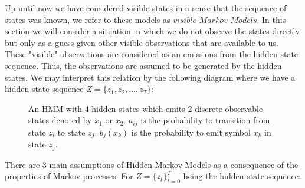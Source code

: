 Up until now we have considered visible states in a sense that the sequence of states was known, we refer to these models as $visible$ $Markov$ $Models$. In this section we will consider a situation in which we do not observe the states directly but only as a guess given other visible observations that are available to us. These "visible" observations are considered as an emissions from the hidden state sequence. Thus, the observations are assumed to be generated by the hidden states. We may interpret this relation by the following diagram where we have a hidden state sequence $Z = \{z_1,z_2,\ldots,z_T\}$:

\begin{figure}[htbp]
\begin{center}
\end{center}
\caption{An HMM with 4 hidden states which emits 2 discrete observable states denoted by $x_1$ or $x_2$.
$a_{ij}$ is the probability to transition from state $z_i$ to state $z_j$.
$b_j(x_k)$ is the probability to emit symbol $x_k$ in state $z_j$.}
\end{figure}

There are 3 main assumptions of Hidden Markov Models as a consequence of the properties of Markov processes. For $Z = \{z_t\}_{t=0}^T$ being the hidden state sequence:

